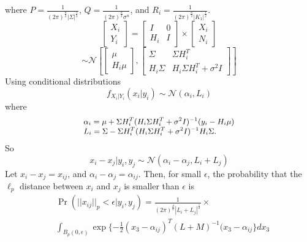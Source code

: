 \documentclass{article}
\begin{document}
where $P=\frac{1}{({2\pi})^{\frac{d}{2}}{|\Sigma|}^{\frac{1}{2}}}$, $Q=\frac{1}{({2\pi})^{\frac{d}{2}}\sigma^n}$, and $R_i=\frac{1}{({2\pi})^{\frac{d}{2}} {|K_1|}^{\frac{1}{2}}}$.
\begin{equation}
 \left[\begin{array}{c} X_i \\ Y_i \end{array}\right] = 
\begin{bmatrix} I & 0 \\ H_i & I \end{bmatrix} \times \left[ \begin{array}{c} X_i \\ N_i \end{array} \right]      
\end{equation}
\begin{equation}
 \sim \mathcal{N} \left[\begin{bmatrix} \mu \\ H_i \mu \end{bmatrix}, \begin{bmatrix} \Sigma & \Sigma H_i^T \\ H_i \Sigma & H_i \Sigma H_i^T + \sigma^2 I \end{bmatrix} \right]
\end{equation}
\noindent
Using conditional distributions
 \begin{equation}
  f_{X_i|Y_i}(x_i|y_i) \sim \mathcal{N}(\alpha_i, L_i)
 \end{equation}
where 
\begin{equation}
\small{
\begin{array}{l}\alpha_i = \mu + \Sigma H_i^T (H_i \Sigma H_i^T + \sigma^2 I)^{-1} (y_i - H_i \mu) \\ L_i = \Sigma - \Sigma H_i^T (H_i \Sigma H_i^T + \sigma^2 I)^{-1} H_i \Sigma .
       \end{array}}  
\end{equation}
So
\begin{equation}
x_i - x_j|y_i, y_j \sim \mathcal{N}(\alpha_i-\alpha_j, L_i+L_j)
\end{equation}
Let $x_i - x_j = x_{ij}$, and $\alpha_i -\alpha_j=\alpha_{ij}$. Then, for small $\epsilon$, the probability that the $\ell_p$ distance between $x_i$ and $x_j$ is smaller than $\epsilon$ is
\begin{align}
&\Pr(||x_{ij}||_{p} < \epsilon|y_i,y_j)   \nonumber
										=   \frac{1}{(2 \pi)^{\frac{d}{2}} |L_{i}+L_{j}|^ \frac{1}{2}} \times \\ 
										& \int_{B_p(0,\epsilon) }^{}\exp \{ -\frac{1}{2}(x_3 - \alpha_{ij})^T(L+M)^{-1}(x_3 - \alpha_{ij}\}dx_3 
\end{align}
\end{document}

